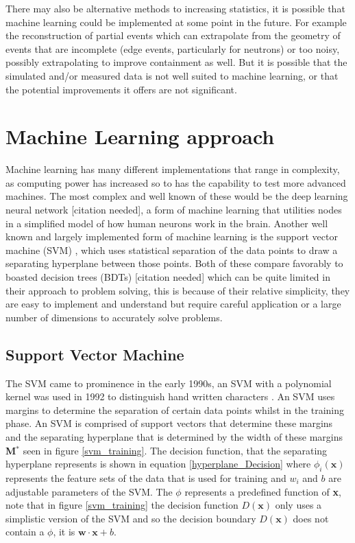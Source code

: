 \documentclass[12pt,a4paper]{article}
\begin{document}
There may also be alternative methods to increasing statistics, it is possible that machine learning could be implemented at some point in the future. For example the reconstruction of partial events which can extrapolate from the geometry of events that are incomplete (edge events, particularly for neutrons) or too noisy, possibly extrapolating to improve containment as well. But it is possible that the simulated and/or measured data is not well suited to machine learning, or that the potential improvements it offers are not significant. 

\section{Machine Learning approach} 
Machine learning has many different implementations that range in complexity, as computing power has increased so to has the capability to test more advanced machines. The most complex and well known of these would be the deep learning neural network [citation needed], a form of machine learning that utilities nodes in a simplified model of how human neurons work in the brain. Another well known and largely implemented form of machine learning is the support vector machine (SVM) \cite{kernelSVMs1992}, which uses statistical separation of the data points to draw a separating hyperplane between those points. Both of these compare favorably to boasted decision trees (BDTs) [citation needed] which can be quite limited in their approach to problem solving, this is because of their relative simplicity, they are easy to implement and understand but require careful application or a large number of dimensions to accurately solve problems.

\subsection{Support Vector Machine}
The SVM came to prominence in the early 1990s, an SVM with a polynomial kernel was used in 1992 to distinguish hand written characters \cite{kernelSVMs1992}. An SVM uses margins to determine the separation of certain data points whilst in the training phase. An SVM is comprised of support vectors that determine these margins and the separating hyperplane that is determined by the width of these margins \textbf{M$^*$} seen in figure \ref{svm_training}. The decision function, that the separating hyperplane represents is shown in equation \ref{hyperplane_Decision} where $\phi_{i}(\textbf{x})$ represents the feature sets of the data that is used for training and $w_i$ and $b$ are adjustable parameters of the SVM\cite{kernelSVMs1992}. The $\phi$ represents a predefined function of \textbf{x}, note that in figure \ref{svm_training} the decision function $D(\textbf{x})$ only uses a simplistic version of the SVM and so the decision boundary $D(\textbf{x})$ does not contain a $\phi$, it is $\textbf{w} \cdot \textbf{x} +b$. 
\end{document}
